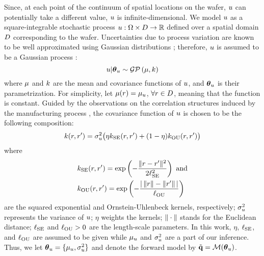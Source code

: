 Since, at each point of the continuum of spatial locations on the wafer, $u$ can potentially take a different value, $u$ is infinite-dimensional. We model $u$ as a square-integrable stochastic process $u: \Omega \times D \to \mathbb{R}$ defined over a spatial domain $D$ corresponding to the wafer. Uncertainties due to process variation are known to be well approximated using Gaussian distributions \cite{srivastava2010}; therefore, $u$ is assumed to be a Gaussian process \cite{rasmussen2006}:
\[
  \u | \vparam_\u \sim \gaussianp{\fMean}{\fCov}
\]
where $\fMean$ and $\fCov$ are the mean and covariance functions of $u$, and ${\boldsymbol\theta}_u$ is their parametrization. For simplicity, let $\fMean{\r} = \mu_\u$, $\forall r \in D$, meaning that the function is constant. Guided by the observations on the correlation structures induced by the manufacturing process \cite{cheng2011}, the covariance function of $u$ is chosen to be the following composition:
\begin{equation} \elabel{covariance-function}
  \fCov{\r, \r'} = \sigma_\u^2 \big( \eta \fCov_\SE(\r, \r') + (1 - \eta) \fCov_\OU(\r, \r') \big)
\end{equation}
where
\begin{align*}
  & \fCov_\SE(\r, \r') = \exp\left(-\frac{\norm{\r - \r'}^2}{2 \ell_\SE^2}\right) \text{ and} \\
  & \fCov_\OU(\r, \r') = \exp\left(- \frac{\abs{\,\norm{\r} - \norm{\r'}\,}}{\ell_\OU} \right)
\end{align*}
are the squared exponential and Ornstein-Uhlenbeck kernels, respectively; $\sigma_u^2$ represents the variance of $u$; $\eta$ weights the kernels; $\| \cdot \|$ stands for the Euclidean distance; $\ell_{\text{SE}}$ and $\ell_{\text{OU}} > 0$ are the length-scale parameters. In this work, $\eta$, $\ell_{\text{SE}}$, and $\ell_{\text{OU}}$ are assumed to be given while $\mu_u$ and $\sigma^2_u$ are a part of our inference. Thus, we let ${\boldsymbol\theta}_u = \{ \mu_u, \sigma_u^2 \}$ and denote the forward model by $\mvT = \model{\vparam_\u}$.

